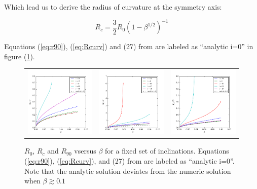 Which lead us to derive the radius of curvature at the symmetry axis:

\begin{equation}
R_c = \frac{3}{2}R_0\left(1-\beta^{1/2}\right)^{-1}
\label{eq:Rcurv}
\end{equation}

Equations (\ref{eq:r90}),  (\ref{eq:Rcurv}) and (27) from \citep{Canto:1996} are labeled as ``analytic i=0'' in figure (\ref{fig:rad-beta}).

\begin{figure}
\begin{tabular}{ccc}
\includegraphics[width=0.35\linewidth]{R0-b}&
\includegraphics[width=0.35\linewidth]{Rc-b} &
\includegraphics[width=0.35\linewidth]{R90-b}
\end{tabular}
\caption{$R_0$, $R_c$ and $R_{90}$ vsersus $\beta$ for a fixed set of inclinations. Equations (\ref{eq:r90}), (\ref{eq:Rcurv}), and (27) from \citep{Canto:1996}
are labeled as ``analytic i=0''. Note that the analytic solution deviates from the numeric solution when $\beta \gtrsim 0.1$}
\label{fig:rad-beta}
\end{figure}

